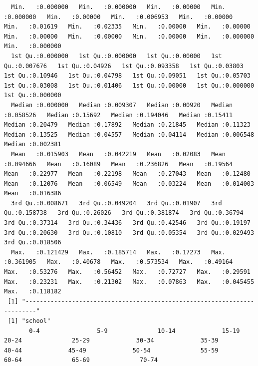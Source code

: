 \documentclass[11pt]{article}
\begin{document}
\begin{itemize}
\begin{verbatim}
  Min.   :0.000000   Min.   :0.000000   Min.   :0.00000   Min.   :0.000000   Min.   :0.00000   Min.   :0.006953   Min.   :0.00000   Min.   :0.01619   Min.   :0.02335   Min.   :0.00000   Min.   :0.00000   Min.   :0.00000   Min.   :0.00000   Min.   :0.00000   Min.   :0.000000   Min.   :0.000000  
  1st Qu.:0.000000   1st Qu.:0.000000   1st Qu.:0.00000   1st Qu.:0.007676   1st Qu.:0.04926   1st Qu.:0.093358   1st Qu.:0.03803   1st Qu.:0.10946   1st Qu.:0.04798   1st Qu.:0.09051   1st Qu.:0.05703   1st Qu.:0.03008   1st Qu.:0.01406   1st Qu.:0.00000   1st Qu.:0.000000   1st Qu.:0.000000  
  Median :0.000000   Median :0.009307   Median :0.00920   Median :0.058526   Median :0.15692   Median :0.194046   Median :0.15411   Median :0.20479   Median :0.17892   Median :0.21845   Median :0.11323   Median :0.13525   Median :0.04557   Median :0.04114   Median :0.006548   Median :0.002381  
  Mean   :0.015903   Mean   :0.042219   Mean   :0.02083   Mean   :0.094666   Mean   :0.16089   Mean   :0.236826   Mean   :0.19564   Mean   :0.22977   Mean   :0.22198   Mean   :0.27043   Mean   :0.12480   Mean   :0.12076   Mean   :0.06549   Mean   :0.03224   Mean   :0.014003   Mean   :0.016386  
  3rd Qu.:0.008671   3rd Qu.:0.049204   3rd Qu.:0.01907   3rd Qu.:0.158738   3rd Qu.:0.26026   3rd Qu.:0.381874   3rd Qu.:0.36794   3rd Qu.:0.37314   3rd Qu.:0.34436   3rd Qu.:0.42546   3rd Qu.:0.19197   3rd Qu.:0.20630   3rd Qu.:0.10810   3rd Qu.:0.05354   3rd Qu.:0.029493   3rd Qu.:0.018506  
  Max.   :0.121429   Max.   :0.185714   Max.   :0.17273   Max.   :0.361905   Max.   :0.40678   Max.   :0.573534   Max.   :0.49164   Max.   :0.53276   Max.   :0.56452   Max.   :0.72727   Max.   :0.29591   Max.   :0.23231   Max.   :0.21302   Max.   :0.07863   Max.   :0.045455   Max.   :0.118182  
 [1] "-------------------------------------------------------------------------"
 [1] "school"
       0-4                5-9              10-14             15-19             20-24              25-29             30-34             35-39             40-44             45-49             50-54              55-59              60-64              65-69              70-74


\end{verbatim}
\end{itemize}
\end{document}
